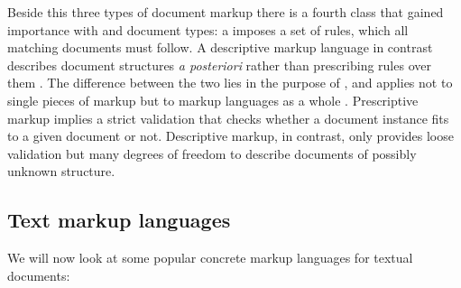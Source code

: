 Beside this three types of document markup there is a fourth class that
gained importance with  and document types: a  imposes a set of rules, which all matching documents
must follow. A descriptive markup language in contrast describes document
structures \emph{a posteriori} rather than prescribing rules over them
\cite{Quin1996,Renear2000}. The difference between the two lies in the
purpose of , and applies not to single pieces of markup
but to markup languages as a whole \cite{Piez2001}. Prescriptive markup implies
a strict validation that checks whether a document instance fits to
a given document or not. Descriptive markup, in contrast, only provides
loose validation but many degrees of freedom to describe documents
of possibly unknown structure.

\subsection{Text markup languages}
We will now look at some popular concrete markup languages for textual
documents:

